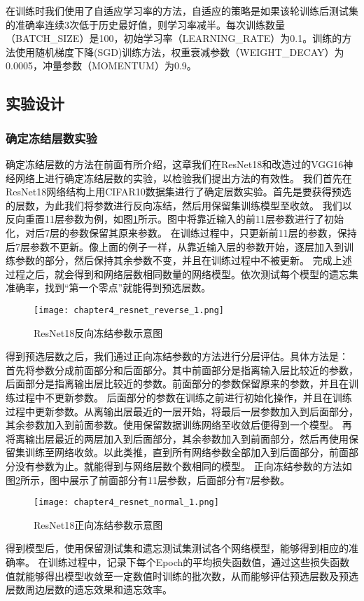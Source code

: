 在训练时我们使用了自适应学习率的方法，自适应的策略是如果该轮训练后测试集的准确率连续3次低于历史最好值，则学习率减半。每次训练数量（BATCH\_SIZE）是100，初始学习率（LEARNING\_RATE）为0.1。训练的方法使用随机梯度下降(SGD)训练方法，权重衰减参数（WEIGHT\_DECAY）为0.0005，冲量参数（MOMENTUM）为0.9。

\subsection{实验设计}
\subsubsection{确定冻结层数实验}

确定冻结层数的方法在前面有所介绍，这章我们在ResNet18和改造过的VGG16神经网络上进行确定冻结层数的实验，以检验我们提出方法的有效性。
我们首先在ResNet18网络结构上用CIFAR10数据集进行了确定层数实验。首先是要获得预选的层数，为此我们将参数进行反向冻结，然后用保留集训练模型至收敛。
我们以反向重置11层参数为例，如图\ref{fig:chapter4_resnet_reverse_1}所示。图中将靠近输入的前11层参数进行了初始化，对后7层的参数保留其原来参数。
在训练过程中，只更新前11层的参数，保持后7层参数不更新。像上面的例子一样，从靠近输入层的参数开始，逐层加入到训练参数的部分，然后保持其余参数不变，并且在训练过程中不被更新。
完成上述过程之后，就会得到和网络层数相同数量的网络模型。依次测试每个模型的遗忘集准确率，找到“第一个零点”就能得到预选层数。
\begin{figure}
    \centering
    \texttt{[image: chapter4\_resnet\_reverse\_1.png]}
    \caption{ResNet18反向冻结参数示意图}
    \label{fig:chapter4_resnet_reverse_1}
\end{figure}

得到预选层数之后，我们通过正向冻结参数的方法进行分层评估。具体方法是：
首先将参数分成前面部分和后面部分。其中前面部分是指离输入层比较近的参数，后面部分是指离输出层比较近的参数。前面部分的参数保留原来的参数，并且在训练过程中不更新参数。
后面部分的参数在训练之前进行初始化操作，并且在训练过程中更新参数。从离输出层最近的一层开始，将最后一层参数加入到后面部分，其余参数加入到前面参数。使用保留数据训练网络至收敛后便得到一个模型。
再将离输出层最近的两层加入到后面部分，其余参数加入到前面部分，然后再使用保留集训练至网络收敛。以此类推，直到所有网络参数全部加入到后面部分，前面部分没有参数为止。就能得到与网络层数个数相同的模型。
正向冻结参数的方法如图\ref{fig:chapter4_resnet_normal_1}所示，图中展示了前面部分有11层参数，后面部分有7层参数。
\begin{figure}
    \centering
    \texttt{[image: chapter4\_resnet\_normal\_1.png]}
    \caption{ResNet18正向冻结参数示意图}
    \label{fig:chapter4_resnet_normal_1}
\end{figure}
得到模型后，使用保留测试集和遗忘测试集测试各个网络模型，能够得到相应的准确率。
在训练过程中，记录下每个Epoch的平均损失函数值，通过这些损失函数值就能够得出模型收敛至一定数值时训练的批次数，从而能够评估预选层数及预选层数周边层数的遗忘效果和遗忘效率。

